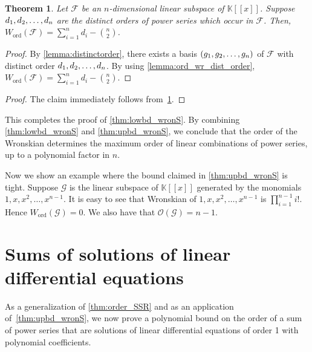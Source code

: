\documentclass[a4paper, 11pt,dvipsnames]{article}
\newtheorem{theorem}{Theorem}
\newcommand{\OF}{\mathcal{O}}
\newcommand{\ord}{\operatorname{ord}}
\newcommand{\BK}{\mathbb{K}}
\begin{document}
  \begin{theorem}\label{thm:lowbdtight_wronS}
    Let $\mathcal{F}$ be an $n$-dimensional linear subspace of $\BK[[x]]$. Suppose  $d_{1},d_{2},\dots,d_{n}$ are the distinct orders of power series which occur in  $\mathcal{F}$. Then, $W_{\ord}(\mathcal{F}) = \sum_{i=1}^{n}d_i - \binom{n}{2}$. 
\end{theorem}
    \begin{proof} 
By \cref{lemma:distinctorder}, there exists a basis $(g_{1},g_{2},\dots,g_{n})$ of $\mathcal{F}$ with distinct order $d_{1},d_{2},\dots,d_{n}$. By using \cref{lemma:ord_wr_dist_order}, $ 	W_{\ord}(\mathcal{F}) = \sum_{i=1}^{n}d_i  - \binom{n}{2}$.\end{proof} 

	\OptimalWronskian*
  \begin{proof} The claim immediately follows from~\cref{thm:lowbdtight_wronS}. \end{proof}
This completes the proof of \cref{thm:lowbd_wronS}. By combining \cref{thm:lowbd_wronS} and \cref{thm:upbd_wronS}, we conclude that the order of the Wronskian determines the maximum order of linear combinations of power series, up to a polynomial factor in $n$. 

Now we show an example where the bound claimed in \cref{thm:upbd_wronS} is  tight. Suppose $\mathcal{G}$ is the linear subspace of  $\BK[[x]]$ generated by the monomials $1,x,x^2,\dots,x^{n-1}$. It is easy to see that Wronskian of $1,x,x^2,\dots,x^{n-1}$ is $\prod_{i=1}^{n-1}i!$. Hence  $W_{\ord}(\mathcal{G})=0$. We also have that $ \OF(\mathcal{G})=n-1$. \section{Sums of solutions of linear differential equations}\label{sec:diffeqs}	

As a generalization of \cref{thm:order_SSR} and as an application of~\cref{thm:upbd_wronS}, we now prove a polynomial bound on the order of a sum of power series
that are solutions of linear differential equations of order 1 with polynomial coefficients.
\end{document}
